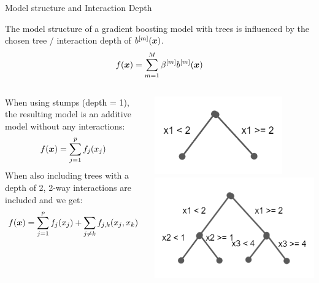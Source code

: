 \begin{vbframe}{Model structure and Interaction Depth}

The model structure of a gradient boosting model with trees is influenced by the chosen
tree / interaction depth of $b^{[m]}(\bm{x})$.
$$
f(\bm{x}) =  \sum_{m=1}^M \beta^{[m]} b^{[m]}(\bm{x})
$$

\lz
\begin{footnotesize}
\begin{columns}[T]
\begin{column}{0.6\textwidth}
When using stumps (depth = 1), the resulting model is an additive model without any interactions:\\
$$
f(\bm{x}) = \sum_{j=1}^p f_j(x_j)
$$
When also including trees with a depth of 2, 2-way interactions are included and we get:\\
$$
f(\bm{x}) = \sum_{j=1}^p f_j(x_j) + \sum_{j \neq k} f_{j,k}(x_j, x_k)
$$
\end{column}
\begin{column}{0.4\textwidth}
\includegraphics[width=0.8\textwidth]{figure/boosting_interact_expl1.PNG}
\includegraphics[width=\textwidth]{figure/boosting_interact_expl2.PNG}
\end{column}
\end{columns}
\end{footnotesize}


\end{vbframe}
